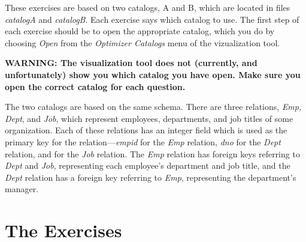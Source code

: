 These exercises are based on two catalogs, A and B, which are located in files
{\em catalogA} and {\em catalogB}.  Each exercise says which catalog to use.  
The first
step of each exercise should be to open the appropriate catalog, which you do
by choosing {\em Open} from the {\em Optimizer Catalogs} menu of the 
vizualization tool.

\centerline{\bf WARNING: The visualization tool does not (currently,
and unfortunately) show you which catalog you have open.  Make 
sure you open the correct catalog for each question.}


The two catalogs are based on the same schema.  There are three
relations, {\em Emp, Dept}, and {\em Job}, which represent employees,
departments, and job titles of some organization.  Each of these
relations has an integer field which is used as the primary key for
the relation---{\em empid} for the {\em Emp} relation, {\em dno} for
the {\em Dept} relation, and {\jno} for the {\em Job} relation.  The
{\em Emp} relation has foreign keys referring to {\em Dept} and {\em
Job}, representing each employee's department and job title, and the
{\em Dept} relation has a foreign key referring to {\em Emp},
representing the department's manager.

\section{The Exercises}


